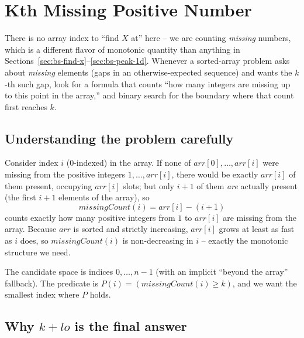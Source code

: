 \section{Kth Missing Positive Number}
\label{sec:bs-kth-missing}


\begin{patternbox}
There is no array index to ``find $X$ at'' here -- we are counting
\emph{missing} numbers, which is a different flavor of monotonic quantity
than anything in Sections~\ref{sec:bs-find-x}--\ref{sec:bs-peak-1d}.
Whenever a sorted-array problem asks about \emph{missing} elements (gaps in
an otherwise-expected sequence) and wants the $k$-th such gap, look for a
formula that counts ``how many integers are missing up to this point in
the array,'' and binary search for the boundary where that count first
reaches $k$.
\end{patternbox}

\subsection*{Understanding the problem carefully}

Consider index $i$ (0-indexed) in the array. If none of $\textit{arr}[0],
\dots, \textit{arr}[i]$ were missing from the positive integers
$1, \dots, \textit{arr}[i]$, there would be exactly $\textit{arr}[i]$ of
them present, occupying $\textit{arr}[i]$ slots; but only $i+1$ of them
\emph{are} actually present (the first $i+1$ elements of the array), so
\[
  \textit{missingCount}(i) = \textit{arr}[i] - (i+1)
\]
counts exactly how many positive integers from $1$ to $\textit{arr}[i]$ are
missing from the array. Because $\textit{arr}$ is sorted and strictly
increasing, $\textit{arr}[i]$ grows at least as fast as $i$ does, so
$\textit{missingCount}(i)$ is non-decreasing in $i$ -- exactly the
monotonic structure we need.

\begin{ideabox}
The candidate space is indices $0, \dots, n-1$ (with an implicit
``beyond the array'' fallback). The predicate is
$P(i) = (\textit{missingCount}(i) \ge k)$, and we want the smallest index
where $P$ holds.
\end{ideabox}

\subsection*{Why $k + \textit{lo}$ is the final answer}

